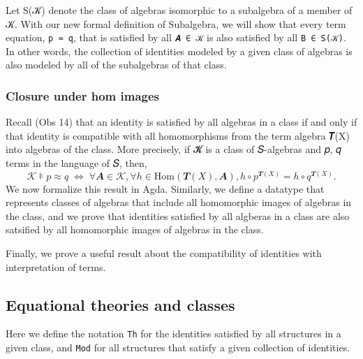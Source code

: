 \documentclass[sigplan,screen]{acmart}
\begin{document}
Let S(𝒦) denote the class of algebras isomorphic to a subalgebra of a member of 𝒦. With our new formal definition of Subalgebra, we will show that every term equation, \texttt{p\ ≈\ q}, that is satisfied by all \texttt{𝑨\ ∈\ 𝒦} is also satisfied by all \texttt{B\ ∈\ S(𝒦)}. In other words, the collection of identities modeled by a given class of algebras is also modeled by all of the subalgebras of that class.
\begin{code}\end{code}

\subsubsection{Closure under hom images}\label{closure-under-hom-images}
Recall (Obs 14) that an identity is satisfied by all algebras in a class if and only if that identity is compatible with all homomorphisms from the term algebra 𝑻(X) into algebras of the class. More precisely, if 𝓚 is a class of 𝑆-algebras and 𝑝, 𝑞 terms in the language of 𝑆, then,
\[𝒦 ⊧ p ≈ q \; ⇔ \; ∀ 𝑨 ∈ 𝒦, ∀ h ∈ \mathrm{Hom}(𝑻(X), 𝑨), h ∘ p^{𝑻(X)} = h ∘ q^{𝑻(X)}.\]
We now formalize this result in Agda. Similarly, we define a datatype that represents classes of algebras that include all homomorphic images of algebras in the class, and we prove that identities satisfied by all algberas in a class are also satsified by all homomorphic images of algebras in the class.
\begin{code}\end{code}

Finally, we prove a useful result about the compatibility of identities with interpretation of terms.
\begin{code}\end{code}

\subsection{Equational theories and classes}\label{equational-theories-and-classes}
Here we define the notation \texttt{Th} for the identities satisfied by all structures in a given class, and \texttt{Mod} for all structures that satisfy a given collection of identities.

\end{document}
